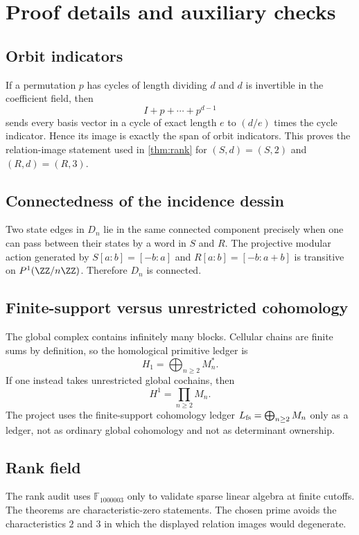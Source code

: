 \section{Proof details and auxiliary checks}
\label{app:proofs}

\subsection{Orbit indicators}

If a permutation $p$ has cycles of length dividing $d$ and $d$ is invertible
in the coefficient field, then
\[
  I+p+\cdots+p^{d-1}
\]
sends every basis vector in a cycle of exact length $e$ to $(d/e)$ times the
cycle indicator.  Hence its image is exactly the span of orbit indicators.
This proves the relation-image statement used in \cref{thm:rank} for
$(S,d)=(S,2)$ and $(R,d)=(R,3)$.

\subsection{Connectedness of the incidence dessin}

Two state edges in $D_n$ lie in the same connected component precisely when
one can pass between their states by a word in $S$ and $R$.  The projective
modular action generated by $S[a:b]=[-b:a]$ and $R[a:b]=[-b:a+b]$ is
transitive on $P^1(\ZZ/n\ZZ)$.  Therefore $D_n$ is connected.

\subsection{Finite-support versus unrestricted cohomology}

The global complex contains infinitely many blocks.  Cellular chains are
finite sums by definition, so the homological primitive ledger is
\[
  H_1=\bigoplus_{n\ge2}M_n^* .
\]
If one instead takes unrestricted global cochains, then
\[
  H^1=\prod_{n\ge2}M_n .
\]
The project uses the finite-support cohomology ledger
$L_{\rm fs}=\bigoplus_{n\ge2}M_n$ only as a ledger, not as ordinary global
cohomology and not as determinant ownership.

\subsection{Rank field}

The rank audit uses $\mathbb F_{1000003}$ only to validate sparse linear
algebra at finite cutoffs.  The theorems are characteristic-zero statements.
The chosen prime avoids the characteristics $2$ and $3$ in which the displayed
relation images would degenerate.
